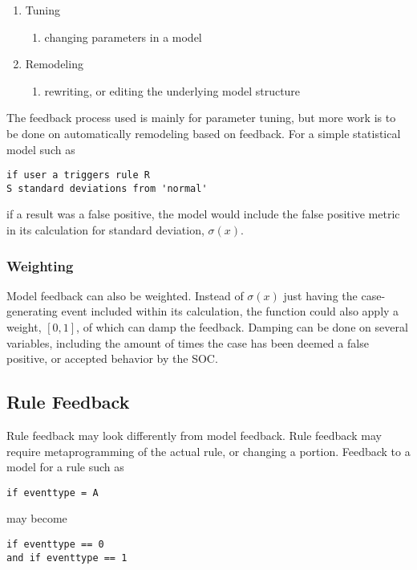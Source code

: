 \documentclass[10pt, titlepage, twocolumn]{report}
\begin{document}
\begin{enumerate}
\item Tuning
	\begin{enumerate}
	\item changing parameters in a model
	\end{enumerate}
\item Remodeling
	\begin{enumerate}
	\item rewriting, or editing the underlying model structure
	\end{enumerate}
\end{enumerate}


The feedback process used is mainly for parameter tuning, but more work is to be done on automatically remodeling based on feedback. For a simple statistical model such as

\begin{verbatim}
if user a triggers rule R
S standard deviations from 'normal'
\end{verbatim}

if a result was a false positive, the model would include the false positive metric in its calculation for standard deviation, \(\sigma(x)\).

\subsubsection{Weighting}
Model feedback can also be weighted. Instead of \(\sigma(x)\) just having the case-generating event included within its calculation, the function could also apply a weight, \([0,1]\), of which can damp the feedback. Damping can be done on several variables, including the amount of times the case has been deemed a false positive, or accepted behavior by the SOC.



\subsection{Rule Feedback}
Rule feedback may look differently from model feedback. Rule feedback may require metaprogramming of the actual rule, or changing a portion. Feedback to a model for a rule such as

\begin{verbatim}
if eventtype = A
\end{verbatim}

may become

\begin{verbatim}
if eventtype == 0 
and if eventtype == 1
\end{verbatim}
\end{document}
